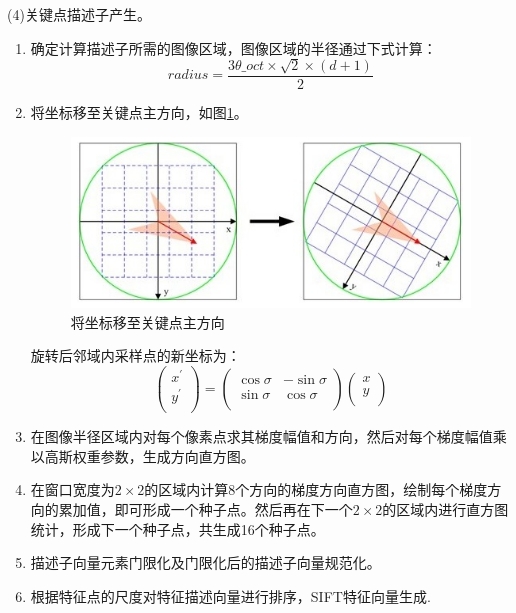 \documentclass[12pt]{article}
\begin{document}
(4)关键点描述子产生。
\begin{enumerate}
    \item 确定计算描述子所需的图像区域，图像区域的半径通过下式计算：
        \begin{displaymath}
        radius=\frac{3\theta\_oct \times \sqrt{2} \times (d+1)}{2}
        \end{displaymath}
    \item 将坐标移至关键点主方向，如图\ref{fig:yi}。
            \begin{figure}
            \centering
            \includegraphics[width=0.5\linewidth]{yi}
            \caption{将坐标移至关键点主方向}
            \label{fig:yi}
        \end{figure}
        
        旋转后邻域内采样点的新坐标为：
        \begin{displaymath}
            \left( \begin{array}{c}
            x^{'} \\
            y^{'} \\
            \end{array} \right)
            =\left( \begin{array}{cc}
            \cos\sigma & -\sin\sigma \\
            \sin\sigma & \cos\sigma \\
            \end{array} \right)
             \left( \begin{array}{c}
            x \\
            y \\
            \end{array} \right)
        \end{displaymath}
        \item 在图像半径区域内对每个像素点求其梯度幅值和方向，然后对每个梯度幅值乘以高斯权重参数，生成方向直方图。
        \item 在窗口宽度为$2 \times 2$的区域内计算8个方向的梯度方向直方图，绘制每个梯度方向的累加值，即可形成一个种子点。然后再在下一个$2 \times 2$的区域内进行直方图统计，形成下一个种子点，共生成16个种子点。
        \item 描述子向量元素门限化及门限化后的描述子向量规范化。
        \item 根据特征点的尺度对特征描述向量进行排序，SIFT特征向量生成.
\end{enumerate}
\end{document}
